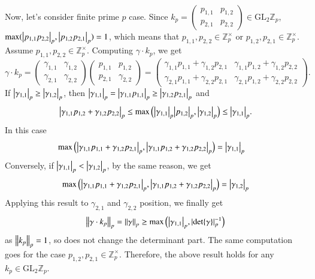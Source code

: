 \documentclass[a4paper, 12pt]{article}
\theoremstyle{Mydefinition}
\theoremstyle{Mytheorem}
\begin{document}
Now, let's consider finite prime $p$ case. Since $k_p=\begin{pmatrix}
p_{1,1} & p_{1,2}\\
p_{2,1} & p_{2,2}
\end{pmatrix}\in \mathrm{GL}_2\mathbb{Z}_p$, $\max(\abs{p_{1,1}p_{2,2}}_p,\abs{p_{1,2}p_{2,1}}_p) = 1$, which means that $p_{1,1},p_{2,2} \in\mathbb{Z}_p^\times$ or $p_{1,2},p_{2,1}\in\mathbb{Z}_p^\times$. Assume $p_{1,1},p_{2,2} \in\mathbb{Z}_p^\times$. Computing $\gamma\cdot k_p$, we get
\begin{equation}
    \gamma\cdot k_p = \begin{pmatrix}
    \gamma_{1,1} & \gamma_{1,2}\\
    \gamma_{2,1} & \gamma_{2,2}
    \end{pmatrix}\begin{pmatrix}
    p_{1,1} & p_{1,2}\\
    p_{2,1} & \gamma_{2,2}
    \end{pmatrix} = \begin{pmatrix}
    \gamma_{1,1}p_{1,1} + \gamma_{1,2}p_{2,1} & \gamma_{1,1}p_{1,2} + \gamma_{1,2}p_{2,2}\\
    \gamma_{2,1}p_{1,1} + \gamma_{2,2}p_{2,1} & \gamma_{2,1}p_{1,2} + \gamma_{2,2}p_{2,2}
    \end{pmatrix}.
\end{equation}
If $\abs{\gamma_{1,1}}_p\geq\abs{\gamma_{1,2}}_p$, then $\abs{\gamma_{1,1}}_p = \abs{\gamma_{1,1}p_{1,1}}_p \geq \abs{\gamma_{1,2}p_{2,1}}_p$ and 
\begin{equation}
    \abs{\gamma_{1,1}p_{1,2} + \gamma_{1,2}p_{2,2}}_p\leq \max\left(\abs{\gamma_{1,1}}_p \abs{p_{1,2}}_p, \abs{\gamma_{1,2}}_p\right)\leq \abs{\gamma_{1,1}}_p.
\end{equation} 
In this case
\begin{equation}
\begin{split}
    \max\left(\abs{\gamma_{1,1}p_{1,1} + \gamma_{1,2}p_{2,1}}_p, \abs{\gamma_{1,1}p_{1,2} + \gamma_{1,2}p_{2,2}}_p\right) &= \abs{\gamma_{1,1}}_p
\end{split}
\end{equation}
Conversely, if $\abs{\gamma_{1,1}}_p<\abs{\gamma_{1,2}}_p$, by the same reason, we get
\begin{equation}
    \max\left(\abs{\gamma_{1,1}p_{1,1} + \gamma_{1,2}p_{2,1}}_p, \abs{\gamma_{1,1}p_{1,2} + \gamma_{1,2}p_{2,2}}_p\right) = \abs{\gamma_{1,2}}_p
\end{equation}
Applying this result to $\gamma_{2,1}$ and $\gamma_{2,2}$ position, we finally get
\begin{equation}
    \norm{\gamma\cdot k_p}_p = \norm{\gamma}_p \geq \max\left(\abs{\gamma_{1,1}}_p, \abs{\det{\gamma}}_p^{-1}\right)
\end{equation}
as $\norm{k_p}_p=1$, so does not change the determinant part. The same computation goes for the case $p_{1,2},p_{2,1}\in\mathbb{Z}_p^\times$. Therefore, the above result holds for any $k_p\in\mathrm{GL}_2\mathbb{Z}_p$.
\end{document}
